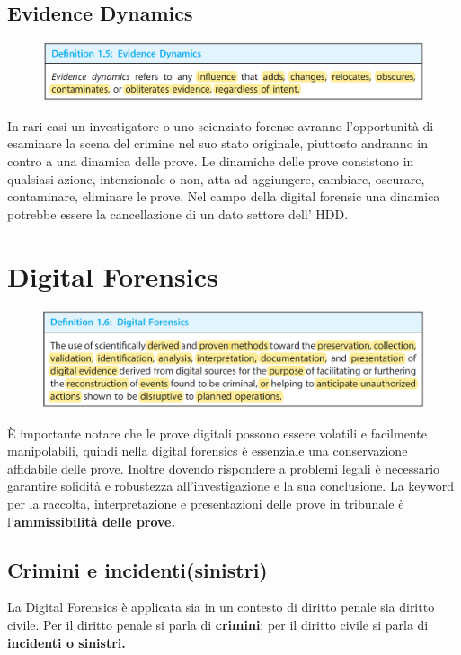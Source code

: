 \subsection{Evidence Dynamics}
\begin{figure}[h!]
    \includegraphics[width=\textwidth]{Capitolo 1/Figure/evidence-dynamic.png}
\end{figure}
In rari casi un investigatore o uno scienziato forense avranno l'opportunità di esaminare la scena del crimine nel suo stato originale, piuttosto andranno in contro a una dinamica delle prove.
Le dinamiche delle prove consistono in qualsiasi azione, intenzionale o non, atta ad aggiungere, cambiare, oscurare, contaminare, eliminare le prove.
Nel campo della digital forensic una dinamica potrebbe essere la cancellazione di un dato settore dell' HDD.

\clearpage
\section{Digital Forensics}
\begin{figure}[h!]
    \includegraphics[width=\textwidth]{Capitolo 1/Figure/digital-forensics-def.png}
\end{figure}
È importante notare che le prove digitali possono essere volatili e facilmente manipolabili, quindi nella digital forensics è essenziale una conservazione affidabile delle prove.
Inoltre dovendo rispondere a problemi legali è necessario garantire solidità e robustezza all'investigazione e la sua conclusione.
La keyword per la raccolta, interpretazione e presentazioni delle prove in tribunale è l'\textbf{ammissibilità delle prove.}

\subsection{Crimini e incidenti(sinistri)}
La Digital Forensics è applicata sia in un contesto di diritto penale sia diritto civile. Per il diritto penale si parla di \textbf{crimini}; per il diritto civile si parla di \textbf{incidenti o sinistri.}

